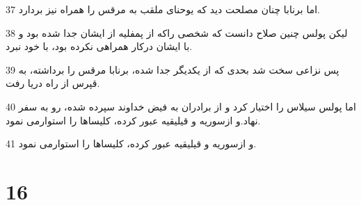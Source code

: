 \par 37 اما برنابا چنان مصلحت دید که یوحنای ملقب به مرقس را همراه نیز بردارد.
\par 38 لیکن پولس چنین صلاح دانست که شخصی راکه از پمفلیه از ایشان جدا شده بود و با ایشان درکار همراهی نکرده بود، با خود نبرد.
\par 39 پس نزاعی سخت شد بحدی که از یکدیگر جدا شده، برنابا مرقس را برداشته، به قپرس از راه دریا رفت.
\par 40 اما پولس سیلاس را اختیار کرد و از برادران به فیض خداوند سپرده شده، رو به سفر نهاد.و ازسوریه و قیلیقیه عبور کرده، کلیساها را استوارمی نمود.
\par 41 و ازسوریه و قیلیقیه عبور کرده، کلیساها را استوارمی نمود.

\chapter{16}

